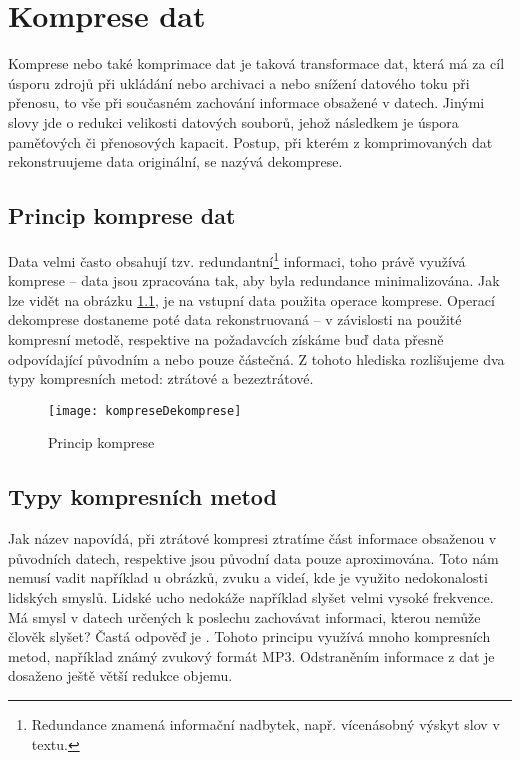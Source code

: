 \chapter{Komprese dat}
Komprese nebo také komprimace dat je taková transformace dat, která má za cíl úsporu zdrojů při ukládání nebo archivaci a nebo snížení datového toku při přenosu, to vše při současném zachování informace obsažené v datech. Jinými slovy jde o redukci velikosti datových souborů, jehož následkem je úspora paměťových či přenosových kapacit. Postup, při kterém z komprimovaných dat rekonstruujeme data originální, se nazývá dekomprese.

\section{Princip komprese dat}
\label{sekcePrincipKompreseDat}
Data velmi často obsahují tzv. redundantní\footnote{Redundance znamená informační nadbytek, např. vícenásobný výskyt slov v textu.} informaci, toho právě využívá komprese -- data jsou zpracována tak, aby byla redundance minimalizována. Jak lze vidět na obrázku \ref{kompreseDekomprese}, je na vstupní data použita operace komprese. Operací dekomprese dostaneme poté data rekonstruovaná -- v závislosti na použité kompresní metodě, respektive na požadavcích získáme buď data přesně odpovídající původním a nebo pouze částečná. Z tohoto hlediska rozlišujeme dva typy kompresních metod: ztrátové a bezeztrátové.

\begin{figure}[!htb]
\centering
\texttt{[image: kompreseDekomprese]}
\caption{Princip komprese}
\label{kompreseDekomprese}
\end{figure}


\section{Typy kompresních metod}
Jak název napovídá, při ztrátové kompresi ztratíme část informace obsaženou v původních datech, respektive jsou původní data pouze aproximována.  Toto nám nemusí vadit například u obrázků, zvuku a videí, kde je využito nedokonalosti lidských smyslů. Lidské ucho nedokáže například slyšet velmi vysoké frekvence. Má smysl v datech určených k poslechu zachovávat informaci, kterou nemůže člověk slyšet? Častá odpověď je . Tohoto principu využívá mnoho kompresních metod, například známý zvukový formát MP3. Odstraněním  informace z dat je dosaženo ještě větší redukce objemu. 

